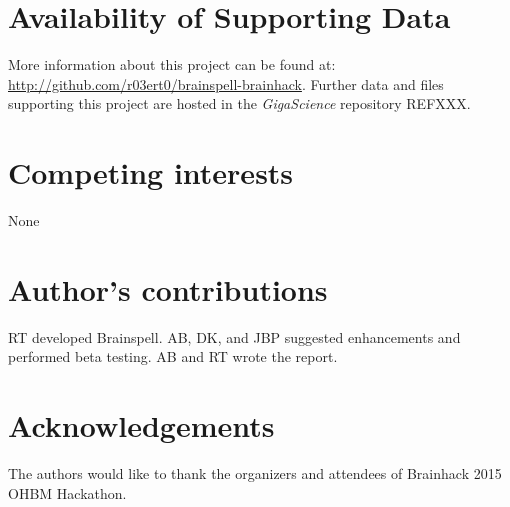 \documentclass[twocolumn]{bmcart}%
\begin{document}
\begin{backmatter}

\section*{Availability of Supporting Data}
More information about this project can be found at: \url{http://github.com/r03ert0/brainspell-brainhack}. Further data and files supporting this project are hosted in the \emph{GigaScience} repository REFXXX.

\section*{Competing interests}
None

\section*{Author's contributions}
RT developed Brainspell. AB, DK, and JBP suggested enhancements and
performed beta testing. AB and RT wrote the report.

\section*{Acknowledgements}
The authors would like to thank the organizers and attendees of
Brainhack 2015 OHBM Hackathon.

  
  


\end{backmatter}
\end{document}
